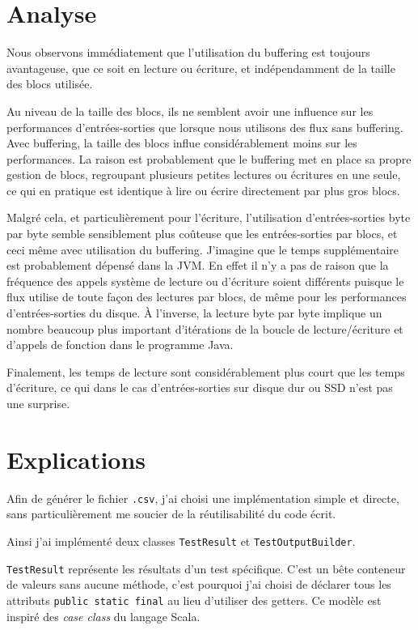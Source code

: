 \documentclass[a4paper,11pt]{article}
\begin{document}
\section{Analyse}

Nous observons immédiatement que l'utilisation du buffering est toujours avantageuse, que ce soit en lecture ou écriture, et indépendamment de la taille des blocs utilisée.

Au niveau de la taille des blocs, ils ne semblent avoir une influence sur les performances d'entrées-sorties que lorsque nous utilisons des flux sans buffering. Avec buffering, la taille des blocs influe considérablement moins sur les performances. La raison est probablement que le buffering met en place sa propre gestion de blocs, regroupant plusieurs petites lectures ou écritures en une seule, ce qui en pratique est identique à lire ou écrire directement par plus gros blocs.

Malgré cela, et particulièrement pour l'écriture, l'utilisation d'entrées-sorties byte par byte semble sensiblement plus coûteuse que les entrées-sorties par blocs, et ceci même avec utilisation du buffering. J'imagine que le temps supplémentaire est probablement dépensé dans la JVM. En effet il n'y a pas de raison que la fréquence des appels système de lecture ou d'écriture soient différents puisque le flux utilise de toute façon des lectures par blocs, de même pour les performances d'entrées-sorties du disque. À l'inverse, la lecture byte par byte implique un nombre beaucoup plus important d'itérations de la boucle de lecture/écriture et d'appels de fonction dans le programme Java.

Finalement, les temps de lecture sont considérablement plus court que les temps d'écriture, ce qui dans le cas d'entrées-sorties sur disque dur ou SSD n'est pas une surprise.

\section{Explications}

Afin de générer le fichier \texttt{.csv}, j'ai choisi une implémentation simple et directe, sans particulièrement me soucier de la réutilisabilité du code écrit.

Ainsi j'ai implémenté deux classes \texttt{TestResult} et \texttt{TestOutputBuilder}.

\texttt{TestResult} représente les résultats d'un test spécifique. C'est un bête conteneur de valeurs sans aucune méthode, c'est pourquoi j'ai choisi de déclarer tous les attributs \texttt{public static final} au lieu d'utiliser des getters. Ce modèle est inspiré des \emph{case class} du langage Scala.
\end{document}
